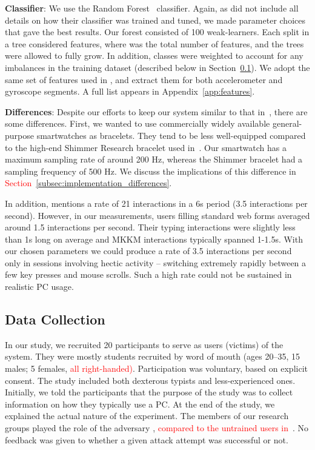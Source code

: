 \documentclass[conference]{IEEEtran}
\newcommand{\attacker}{\xspace}
\newcommand\changeOtto[1]{\textcolor{red}{#1}}
\newcommand\changeMika[1]{\textcolor{red}{#1}}
\newcommand\changeOtto[1]{{#1}}
\newcommand\changeMika[1]{{#1}}
\begin{document}
\vspace{1mm}
\noindent\textbf{Classifier}: We use the Random
Forest~\cite{breiman2001random} classifier. Again, as \cite{mare2014zebra} did not include all details on how their classifier was trained and tuned, we made parameter choices that gave the best results. Our forest consisted of 100 weak-learners. Each split in a tree considered  features, where  was the total number of features, and the trees were allowed to fully grow. In addition, classes were weighted to account for any imbalances in the training dataset (described below in Section~\ref{sec:victim-data}).
We adopt the same set of features used in \cite{mare2014zebra}, and extract them for both accelerometer and gyroscope segments. A full list appears in Appendix~\ref{app:features}.


\noindent\textbf{Differences}: Despite our efforts to keep our system similar to that in~\cite{mare2014zebra}, there are some differences. First, we wanted to use commercially widely available general-purpose smartwatches as bracelets. They tend to be less well-equipped compared to the high-end Shimmer Research bracelet used in~\cite{mare2014zebra}. Our smartwatch has a maximum sampling rate of around 200 Hz, whereas the Shimmer bracelet had a sampling frequency of 500 Hz. We discuss the implications of this difference in \changeMika{Section~\ref{subsec:implementation_differences}}.

In addition, \cite{mare2014zebra} mentions a rate of 21 interactions in a 6s period (3.5 interactions per second). However, in our measurements, users filling standard web forms averaged around 1.5 interactions per second. Their typing interactions were slightly less than 1s long on average and MKKM interactions typically spanned 1-1.5s. With our chosen parameters we could produce a rate of 3.5 interactions per second only in sessions involving hectic activity -- switching extremely rapidly between a few key presses and mouse scrolls. Such a high rate could not be sustained in realistic PC usage.




\subsection{Data Collection}
\label{sec:victim-data}

In our study, we recruited 20 participants to serve as users (victims) of the system.
They were mostly students recruited by word of mouth (ages 20--35, 15 males; 5
females, \changeMika{all right-handed)}. 
Participation was voluntary, based on explicit consent. 
The study included both dexterous typists and less-experienced ones.
Initially, we
told the participants that the purpose of the study was to collect information
on how they typically use a PC. At the end of the study, we explained the actual nature of the experiment. The members of our research groups played the role of the adversary \attacker, \changeOtto{compared to the untrained users in~\cite{mare2014zebra}}.
No feedback was given to \attacker whether a given attack attempt was successful or not.
\end{document}
